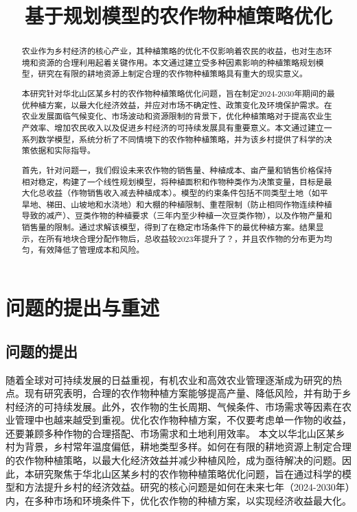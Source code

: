 \documentclass{cumcmthesis}
\title{基于规划模型的农作物种植策略优化}
\begin{document}
\maketitle

\begin{abstract}
农业作为乡村经济的核心产业，其种植策略的优化不仅影响着农民的收益，也对生态环境和资源的合理利用起着关键作用。本文通过建立受多种因素影响的种植策略规划模型，研究在有限的耕地资源上制定合理的农作物种植策略具有重大的现实意义。

本研究针对华北山区某乡村的农作物种植策略优化问题，旨在制定2024-2030年期间的最优种植方案，以最大化经济效益，并应对市场不确定性、政策变化及环境保护需求。在农业发展面临气候变化、市场波动和资源限制的背景下，优化种植策略对于提高农业生产效率、增加农民收入以及促进乡村经济的可持续发展具有重要意义。本文通过建立一系列数学模型，系统分析了不同情境下的农作物种植策略，并为该乡村提供了科学的决策依据和实际指导。

首先，针对问题一，我们假设未来农作物的销售量、种植成本、亩产量和销售价格保持相对稳定，构建了一个线性规划模型，将种植面积和作物种类作为决策变量，目标是最大化总收益（作物销售收入减去种植成本）。模型的约束条件包括不同类型土地（如平旱地、梯田、山坡地和水浇地）和大棚的种植限制、重茬限制（防止相同作物连续种植导致的减产）、豆类作物的种植要求（三年内至少种植一次豆类作物），以及作物产量和销售量的限制。通过求解该模型，得到了在稳定市场条件下的最优种植方案。结果显示，在所有地块合理分配作物后，总收益较2023年提升了？，并且农作物的分布更为均匀，有效降低了管理成本和风险。

\end{abstract}

\section{问题的提出与重述}
\subsection{问题的提出}
随着全球对可持续发展的日益重视，有机农业和高效农业管理逐渐成为研究的热点。现有研究表明，合理的农作物种植方案能够提高产量、降低风险，并有助于乡村经济的可持续发展\cite{ref1}。此外，农作物的生长周期、气候条件、市场需求等因素在农业管理中也越来越受到重视。优化农作物种植方案，不仅要考虑单一作物的收益，还要兼顾多种作物的合理搭配、市场需求和土地利用效率。
本文以华北山区某乡村为背景，乡村常年温度偏低，耕地类型多样。如何在有限的耕地资源上制定合理的农作物种植策略，以最大化经济效益并减少种植风险，成为亟待解决的问题。因此，本研究聚焦于华北山区某乡村的农作物种植策略优化问题，旨在通过科学的模型和方法提升乡村的经济效益。研究的核心问题是如何在未来七年（2024-2030年）内，在多种市场和环境条件下，优化农作物的种植方案，以实现经济收益最大化。
\end{document}
